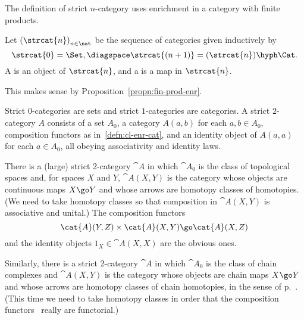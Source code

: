 The definition of strict $n$-category uses enrichment%
%
%
%
%
in a category with
finite products.  
%
\begin{defn}	
Let $\left( \strcat{n} \right)_{n\in\nat}$%
% 
%
be the sequence of categories
given inductively by
\[
\strcat{0} = \Set,
\diagspace
\strcat{(n+1)} = (\strcat{n})\hyph\Cat.
\]
A %
%
%
is an object of $\strcat{n}$, and a
%
%
%
is a map in $\strcat{n}$.
\end{defn}
%
This makes sense by
Proposition~\ref{propn:fin-prod-enr}.  

Strict $0$-categories are sets and strict $1$-categories are categories.  A
strict $2$-category%
%
%
$A$ consists of a set $A_0$, a category $A(a,b)$ for
each $a, b \in A_0$, composition functors as in~\ref{defn:cl-enr-cat}, and
an identity object of $A(a,a)$ for each $a\in A_0$, all obeying
associativity and identity laws.  

\begin{example}
There is a (large) strict 2-category $\cat{A}$ in which $\cat{A}_0$ is the
class of topological%
%
%
spaces and, for spaces $X$ and $Y$, $\cat{A}(X, Y)$ is
the category whose objects are continuous maps $X \go Y$ and whose arrows
are homotopy
classes%
%
% 
of homotopies.  (We need to take homotopy classes so
that composition in $\cat{A}(X, Y)$ is associative and unital.)  The
composition functors
% 
\begin{equation}	\label{eq:2-cat-comp-ftr}
\cat{A}(Y, Z) \times \cat{A}(X, Y) \go \cat{A}(X, Z)
\end{equation}
%
and the identity objects $1_X \in \cat{A}(X, X)$ are the obvious ones.
\end{example}

\begin{example}
Similarly, there is a strict 2-category $\cat{A}$ in which $\cat{A}_0$ is
the class of chain%
%
%
complexes and $\cat{A}(X, Y)$ is the category whose objects are chain maps
$X \go Y$ and whose arrows are homotopy classes%
%
%
of chain homotopies, in the
sense of p.~\pageref{p:ch-hty-hty}.  (This time we need to take homotopy
classes in order that the composition functors~
really are functorial.)
\end{example}

